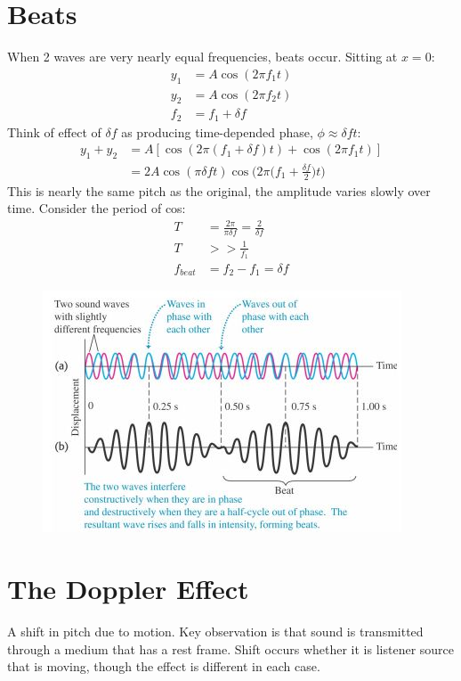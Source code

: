 \documentclass[a4paper, 11pt, normalem]{report}
\begin{document}
\section{Beats}
When 2 waves are very nearly equal frequencies, beats occur.
Sitting at $x = 0$:
\begin{align}
    y_{1} &= A\cos{(2\pi f_{1}t)} \\
    y_{2} &= A\cos{(2\pi f_{2}t)} \\
    f_{2} &= f_{1} + \delta f
\end{align}
Think of effect of $\delta f$ as producing time-depended phase, $\phi \approx \delta ft$:
\begin{align}
    y_{1} + y_{2} &= A[\cos{(2\pi(f_{1} + \delta f)t)} + \cos{(2\pi f_{1}t)}] \\
                  &= 2A\cos{(\pi\delta ft)}\cos{\Big(2\pi\Big(f_{1} + \frac{\delta f}{2}\Big)t\Big)}
\end{align}
This is nearly the same pitch as the original, the amplitude varies slowly over time.
Consider the period of cos:
\begin{align}
    T &= \frac{2\pi}{\pi\delta f} = \frac{2}{\delta f} \\
    T &>> \frac{1}{f_{1}} \\
    f_{beat} &= f_{2} - f_{1} = \delta f
\end{align}
\begin{figure}[H]
    \centering
    \includegraphics[scale=0.8]{Beat.jpg}
\end{figure}

\section{The Doppler Effect}
A shift in pitch due to motion.
Key observation is that sound is transmitted through a medium that has a rest frame.
Shift occurs whether it is listener source that is moving, though the effect is different in each case.
\end{document}
